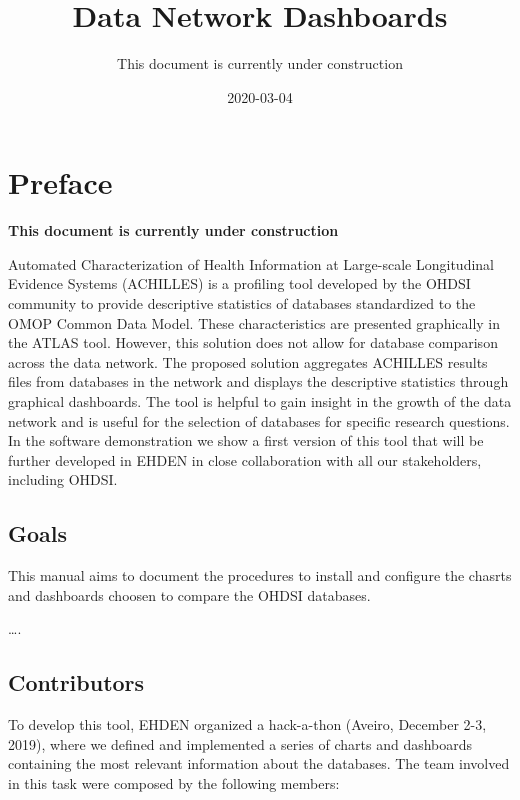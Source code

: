 \documentclass[]{book}
\title{Data Network Dashboards}
\author{This document is currently under construction}
\date{2020-03-04}
\begin{document}
\maketitle

{
\setcounter{tocdepth}{1}
\tableofcontents
}
\chapter*{Preface}\label{preface}

\textbf{This document is currently under construction}

Automated Characterization of Health Information at Large-scale
Longitudinal Evidence Systems (ACHILLES) is a profiling tool developed
by the OHDSI community to provide descriptive statistics of databases
standardized to the OMOP Common Data Model. These characteristics are
presented graphically in the ATLAS tool. However, this solution does not
allow for database comparison across the data network. The proposed
solution aggregates ACHILLES results files from databases in the network
and displays the descriptive statistics through graphical dashboards.
The tool is helpful to gain insight in the growth of the data network
and is useful for the selection of databases for specific research
questions. In the software demonstration we show a first version of this
tool that will be further developed in EHDEN in close collaboration with
all our stakeholders, including OHDSI.

\section*{Goals}\label{goals}

This manual aims to document the procedures to install and configure the
chasrts and dashboards choosen to compare the OHDSI databases.

\ldots{}.

\section*{Contributors}\label{contributors}

To develop this tool, EHDEN organized a hack-a-thon (Aveiro, December
2-3, 2019), where we defined and implemented a series of charts and
dashboards containing the most relevant information about the databases.
The team involved in this task were composed by the following members:
\end{document}
